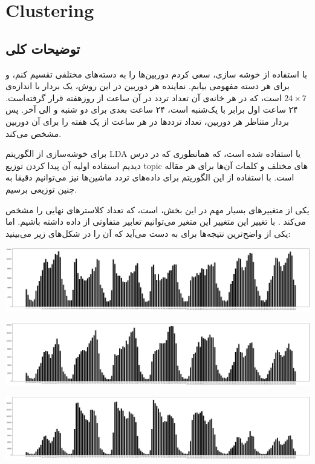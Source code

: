 \section{Clustering}

\subsection{توضیحات کلی}

با استفاده از خوشه‌ سازی، سعی کردم دوربین‌ها را به دسته‌های مختلفی تقسیم کنم، و برای 
هر دسته مفهومی بیابم. نماینده‌ هر دوربین در این روش، یک بردار با اندازه‌ی 
$24 \times 7$
است، که در هر خانه‌ی آن تعداد تردد در آن ساعت از روزهفته قرار گرفته‌است. ۲۴ ساعت اول 
برابر با یک‌شنبه است، ۲۴ ساعت بعدی برای دو شنبه و الی آخر. پس بردار 
متناظر هر دوربین، تعداد تردد‌ها در هر ساعت از یک هفته را برای آن دوربین 
مشخص می‌کند. 

برای خوشه‌سازی از الگوریتم 
LDA یا 
استفاده شده است، که همانطوری که در درس دیدیم استفاده اولیه آن پیدا کردن 
توزیع 
topic
های مختلف و کلمات آن‌ها برای هر مقاله است. با استفاده از این الگوریتم برای 
داده‌های تردد ماشین‌ها نیز می‌توانیم دقیقا به چنین توزیعی برسیم. 

یکی از متغییر‌های بسیار مهم در این بخش، 
است، که تعداد کلاستر‌های نهایی را مشخص می‌کند . با تغییر این متغییر این متغیر می‌توانیم تعابیر متفاوتی از داده‌ داشته باشیم. اما یکی از واضح‌ترین نتیجه‌‌ها برای
\mbox{}
به دست می‌آید که آن را در شکل‌های زیر می‌بینید: 

\includegraphics[scale=0.2]{images/Clustering/1.png}

\includegraphics[scale=0.2]{images/Clustering/2.png}

\includegraphics[scale=0.2]{images/Clustering/3.png}



